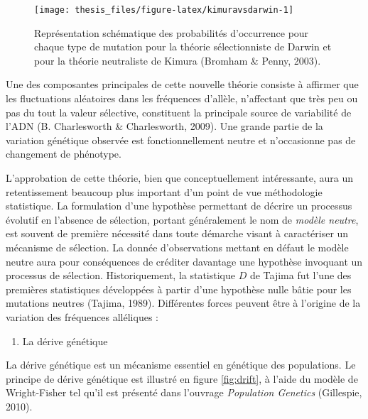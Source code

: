 \documentclass[12pt,a4paper,twoside]{ugathesis}
\providecommand{\tightlist}{%
  \setlength{\itemsep}{0pt}\setlength{\parskip}{0pt}}
\theoremstyle{definition}
\theoremstyle{definition}
\theoremstyle{remark}
\begin{document}
\begin{figure}

{\centering \texttt{[image: thesis\_files/figure-latex/kimuravsdarwin-1]} 

}

\caption{Représentation schématique des probabilités
d'occurrence pour chaque type de mutation pour la théorie sélectionniste
de Darwin et pour la théorie neutraliste de Kimura (Bromham \& Penny,
2003).}\label{fig:kimuravsdarwin}
\end{figure}
Une des composantes principales de cette nouvelle théorie consiste à
affirmer que les fluctuations aléatoires dans les fréquences d'allèle,
n'affectant que très peu ou pas du tout la valeur sélective, constituent
la principale source de variabilité de l'ADN (B. Charlesworth \&
Charlesworth, 2009). Une grande partie de la variation génétique
observée est fonctionnellement neutre et n'occasionne pas de changement
de phénotype.

L'approbation de cette théorie, bien que conceptuellement intéressante,
aura un retentissement beaucoup plus important d'un point de vue
méthodologie statistique. La formulation d'une hypothèse permettant de
décrire un processus évolutif en l'absence de sélection, portant
généralement le nom de \emph{modèle neutre}, est souvent de première
nécessité dans toute démarche visant à caractériser un mécanisme de
sélection. La donnée d'observations mettant en défaut le modèle neutre
aura pour conséquences de créditer davantage une hypothèse invoquant un
processus de sélection. Historiquement, la statistique \(D\) de Tajima
fut l'une des premières statistiques développées à partir d'une
hypothèse nulle bâtie pour les mutations neutres (Tajima, 1989).
Différentes forces peuvent être à l'origine de la variation des
fréquences alléliques :
\begin{enumerate}
\def\labelenumi{\arabic{enumi}.}
\tightlist
\item
  La dérive génétique
\end{enumerate}
La dérive génétique est un mécanisme essentiel en génétique des
populations. Le principe de dérive génétique est illustré en figure
\ref{fig:drift}, à l'aide du modèle de Wright-Fisher tel qu'il est
présenté dans l'ouvrage \emph{Population Genetics} (Gillespie, 2010).
\end{document}
